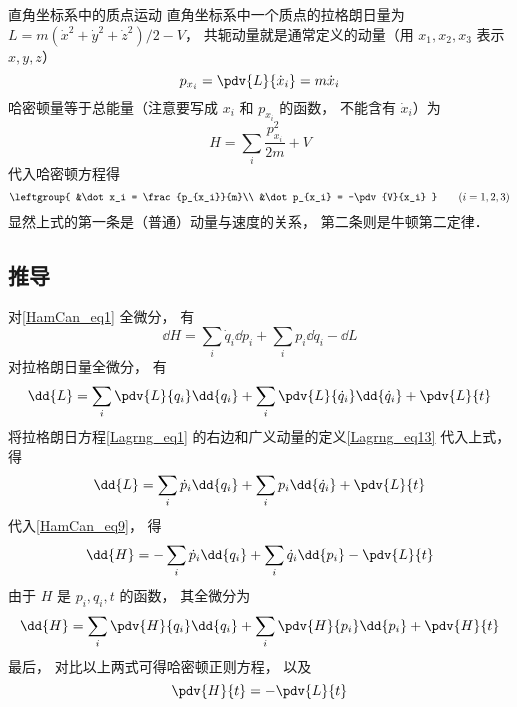 \begin{example}{直角坐标系中的质点运动}
直角坐标系中一个质点的拉格朗日量为 $L = m(\dot x^2 + \dot y^2 + \dot z^2)/2 - V$， 共轭动量就是通常定义的动量（用 $x_1,x_2,x_3$ 表示 $x, y, z$）
\begin{equation}
p_{x_i} = \pdv{L}{\dot x_i} = m\dot x_i
\end{equation}
哈密顿量等于总能量（注意要写成 $x_i$ 和 $p_{x_i}$ 的函数， 不能含有 $\dot x_i$）为
\begin{equation}
H = \sum_i \frac{p_{x_i}^2}{2m} + V
\end{equation}
代入哈密顿方程得
\begin{equation}
\leftgroup{
&\dot x_i = \frac{p_{x_i}}{m}\\
&\dot p_{x_i} = -\pdv{V}{x_i}
} \qquad (i = 1,2,3)
\end{equation}
显然上式的第一条是（普通）动量与速度的关系， 第二条则是牛顿第二定律．
\end{example}

\subsection{推导}
对\autoref{HamCan_eq1} 全微分， 有
\begin{equation}\label{HamCan_eq9}
\dd{H} = \sum_i \dot q_i \dd{p_i} + \sum_i p_i \dd{\dot q_i} - \dd{L}
\end{equation}
对拉格朗日量全微分， 有
\begin{equation}
\dd{L} = \sum_i \pdv{L}{q_i}\dd{q_i} + \sum_i \pdv{L}{\dot q_i}\dd{\dot q_i} + \pdv{L}{t}
\end{equation}
将拉格朗日方程\autoref{Lagrng_eq1} 的右边和广义动量的定义\autoref{Lagrng_eq13} 代入上式， 得
\begin{equation}
\dd{L} = \sum_i \dot p_i\dd{q_i} + \sum_i p_i\dd{\dot q_i} + \pdv{L}{t}
\end{equation}
代入\autoref{HamCan_eq9}， 得
\begin{equation}
\dd{H} = - \sum_i \dot p_i \dd{q_i} + \sum_i \dot q_i \dd{p_i}  - \pdv{L}{t}
\end{equation}
由于 $H$ 是 $p_i, q_i, t$ 的函数， 其全微分为 
\begin{equation}
\dd{H} = \sum_i \pdv{H}{q_i}\dd{q_i} + \sum_i \pdv{H}{p_i}\dd{p_i} + \pdv{H}{t}
\end{equation}
最后， 对比以上两式可得哈密顿正则方程， 以及
\begin{equation}
\pdv{H}{t} = - \pdv{L}{t}
\end{equation}
